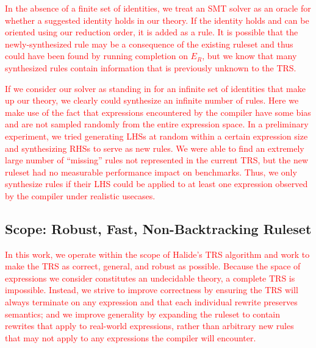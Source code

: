 \documentclass[acmsmall,review]{acmart}\settopmatter{printfolios=true,printccs=false,printacmref=false}
\newcommand{\modified}[1]{\textcolor{red}{{#1}}}
\begin{document}

\modified{%
In the absence of a finite set of identities, we
treat an SMT solver as an oracle for whether a suggested identity 
holds in our theory. If the identity holds and can be oriented using our reduction order, 
it is added as a rule. It is possible that the newly-synthesized rule may be a consequence 
of the existing ruleset and thus could have been found by running completion on $E_R$, 
but we know that many synthesized rules contain information that is previously 
unknown to the TRS.}

\modified{If we consider our solver as standing in for an infinite set of identities that make up
our theory, we clearly could synthesize an infinite number of rules. Here we make use
of the fact that expressions encountered by the compiler have some bias 
and are not sampled randomly from the entire expression space. In a preliminary 
experiment, we tried generating LHSs at random within a certain expression size and 
synthesizing RHSs to serve as new rules. We were able to find an extremely large number of 
``missing'' rules not represented in the current TRS, but the new ruleset had 
no measurable performance impact on benchmarks. Thus, we only synthesize rules if their LHS could be 
applied to at least one expression observed by the compiler under realistic usecases. %
}

\subsection{Scope: Robust, Fast, Non-Backtracking Ruleset}
\modified{In this work, we operate within the scope of Halide's TRS algorithm
  and work to make the TRS as correct, general, and robust as possible.  Because
  the space of expressions we consider constitutes an undecidable theory, a complete
  TRS is impossible.  Instead, we strive to improve correctness by ensuring the TRS
  will always terminate on any expression and that each individual rewrite
  preserves semantics; and we improve generality by expanding the ruleset to
  contain rewrites that apply to real-world expressions, rather than
  arbitrary new rules that may not apply to any expressions the compiler will encounter.}
\end{document}
